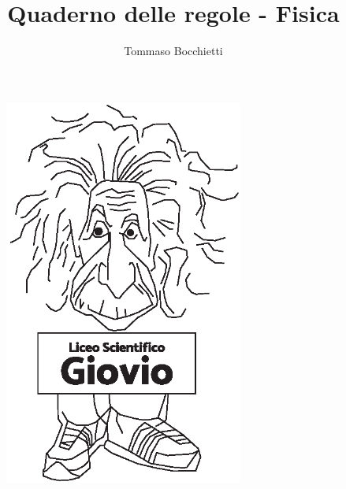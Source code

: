 \documentclass{../.common/high-school-notebook}
\begin{document}
\title{Quaderno delle regole - Fisica}
\author{Tommaso Bocchietti}

\maketitle

\begin{figure}[H]
    \centering
    \includegraphics[width=0.7\textwidth]{../.common/Einstein_Logo}
    \label{fig:Einstein_Logo}
\end{figure}


\clearpage
\tableofcontents

% 

% 
% 
% 

% 
% 
% 
% 
% 
% 
% 
% 

\clearpage
% 
% 
% 
% 
% 
% 

\clearpage
% 
% 

% 
% 
% 
% 
% 
% 
\end{document}
